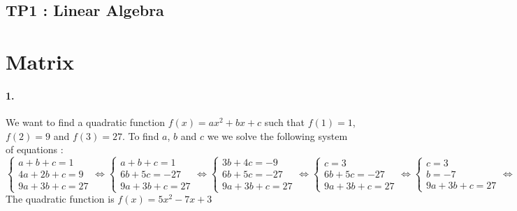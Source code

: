 \documentclass[14pt]
{article}
\begin{document}
\pagestyle{fancy}

\begin{center}
	\section*{\textbf{{\LARGE TP1 : Linear Algebra}}}
\end{center}
\bigskip\bigskip\bigskip

\section{Matrix} %
\bigskip
\paragraph*{1.} We want to find a quadratic function $f(x)=ax^{2}+bx+c$ such that $f(1)=1$, $f(2)=9$ and $f(3)=27$. To find $a$, $b$ and $c$ we we solve the following system of equations :\\
$\begin{cases}a+b+c=1\\4a+2b+c=9\\9a+3b+c=27\end{cases} \Leftrightarrow \begin{cases}a+b+c=1\\6b+5c=-27\\9a+3b+c=27\end{cases} \Leftrightarrow \begin{cases}3b+4c=-9\\6b+5c=-27\\9a+3b+c=27\end{cases} \Leftrightarrow \begin{cases}c=3\\6b+5c=-27\\9a+3b+c=27\end{cases} \Leftrightarrow \begin{cases}c=3\\b=-7\\9a+3b+c=27\end{cases} \Leftrightarrow \begin{cases}c=3\\b=-7\\a=5\end{cases}$\\
The quadratic function is $f(x)=5x^{2}-7x+3$\\
\end{document}
